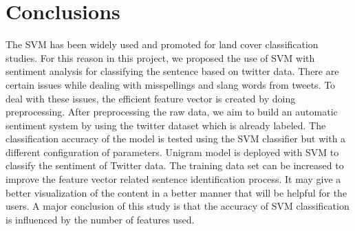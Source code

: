 \section{Conclusions}
\label{sec:concl}

The SVM has been widely used and promoted for land cover classification studies. For this reason in this project, we proposed the use of SVM with sentiment analysis for classifying the sentence based on twitter data. There are certain issues while dealing with misspellings and slang words from tweets. To deal with these issues, the efficient feature vector is created by doing preprocessing. After preprocessing the raw data, we aim to build an automatic sentiment system by using the twitter dataset which is already labeled. The classification accuracy of the model is tested using the SVM classifier but with a different configuration of parameters. Unigram model is deployed with SVM to classify the sentiment of Twitter data. The training data set can be increased to improve the feature vector related sentence identification process. It may give a better visualization of the content in a better manner that will be helpful for the users. A major conclusion of this study is that the accuracy of SVM classification is influenced by the number of features used.


